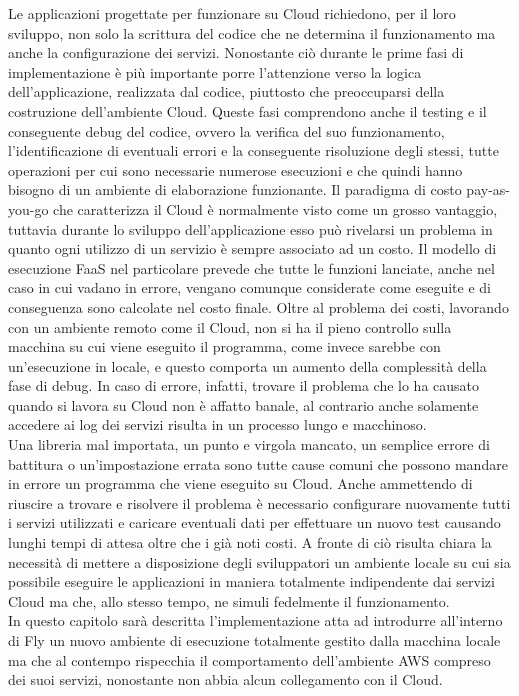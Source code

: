 Le applicazioni progettate per funzionare su Cloud richiedono, per il loro sviluppo, non solo la scrittura del codice che ne determina il funzionamento ma anche la configurazione dei servizi. Nonostante ciò durante le prime fasi di implementazione è più importante porre l'attenzione verso la logica dell'applicazione, realizzata dal codice, piuttosto che preoccuparsi della costruzione dell'ambiente Cloud. Queste fasi comprendono anche il testing e il conseguente debug del codice, ovvero la verifica del suo funzionamento, l'identificazione di eventuali errori e la conseguente risoluzione degli stessi, tutte operazioni per cui sono necessarie numerose esecuzioni e che quindi hanno bisogno di un ambiente di elaborazione funzionante. Il paradigma di costo pay-as-you-go che caratterizza il Cloud è normalmente visto come un grosso vantaggio, tuttavia durante lo sviluppo dell'applicazione esso può rivelarsi un problema in quanto ogni utilizzo di un servizio è sempre associato ad un costo. Il modello di esecuzione FaaS nel particolare prevede che tutte le funzioni lanciate, anche nel caso in cui vadano in errore, vengano comunque considerate come eseguite e di conseguenza sono calcolate nel costo finale. Oltre al problema dei costi, lavorando con un ambiente remoto come il Cloud, non si ha il pieno controllo sulla macchina su cui viene eseguito il programma, come invece sarebbe con un'esecuzione in locale, e questo comporta un aumento della complessità della fase di debug. In caso di errore, infatti, trovare il problema che lo ha causato quando si lavora su Cloud non è affatto banale, al contrario anche solamente accedere ai log dei servizi risulta in un processo lungo e macchinoso. \\
Una libreria mal importata, un punto e virgola mancato, un semplice errore di battitura o un'impostazione errata sono tutte cause comuni che possono mandare in errore un programma che viene eseguito su Cloud. Anche ammettendo di riuscire a trovare e risolvere il problema è necessario configurare nuovamente tutti i servizi utilizzati e caricare eventuali dati per effettuare un nuovo test causando lunghi tempi di attesa oltre che i già noti costi. A fronte di ciò risulta chiara la necessità di mettere a disposizione degli sviluppatori un ambiente locale su cui sia possibile eseguire le applicazioni in maniera totalmente indipendente dai servizi Cloud ma che, allo stesso tempo, ne simuli fedelmente il funzionamento.\\
In questo capitolo sarà descritta l'implementazione atta ad introdurre all'interno di Fly un nuovo ambiente di esecuzione totalmente gestito dalla macchina locale ma che al contempo rispecchia il comportamento dell'ambiente AWS compreso dei suoi servizi, nonostante non abbia alcun collegamento con il Cloud.

